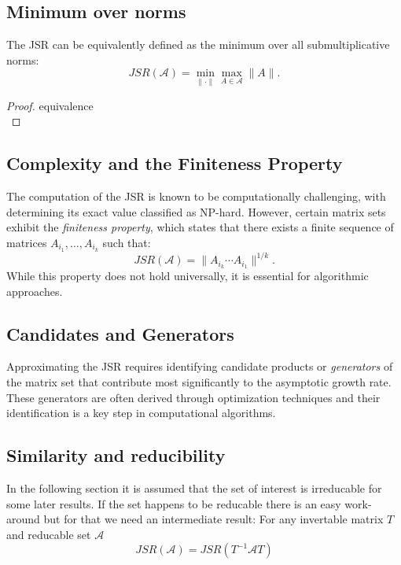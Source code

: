 \subsection*{Minimum over norms}
The JSR can be equivalently defined as the minimum over all submultiplicative norms:
\begin{equation}
    JSR(\mathcal{A}) = \min_{\|\cdot\|} \max_{A \in \mathcal{A}} \|A\|.
\end{equation}
\begin{proof}{equivalence\\}

\end{proof}

\subsection*{Complexity and the Finiteness Property}
The computation of the JSR is known to be computationally challenging, with determining its exact value classified as NP-hard. However, certain matrix sets exhibit the \emph{finiteness property}, which states that there exists a finite sequence of matrices $A_{i_1}, \dots, A_{i_k}$ such that:
\begin{equation}
    JSR(\mathcal{A}) = \|A_{i_k} \cdots A_{i_1}\|^{1/k}.
\end{equation}
While this property does not hold universally, it is essential for algorithmic approaches.

\subsection*{Candidates and Generators}
Approximating the JSR requires identifying candidate products or \emph{generators} of the matrix set that contribute most significantly to the asymptotic growth rate. These generators are often derived through optimization techniques and their identification is a key step in computational algorithms.

\subsection*{Similarity and reducibility}
In the following section it is assumed that the set of interest is irreducable for some later results. If the set happens to be reducable there is an easy work-around but for that we need an intermediate result: 
For any invertable matrix $T$ and reducable set $\mathcal{A}$
\begin{equation}
   JSR(\mathcal{A}) = JSR(T^{-1}\mathcal{A}T) 
\end{equation}

